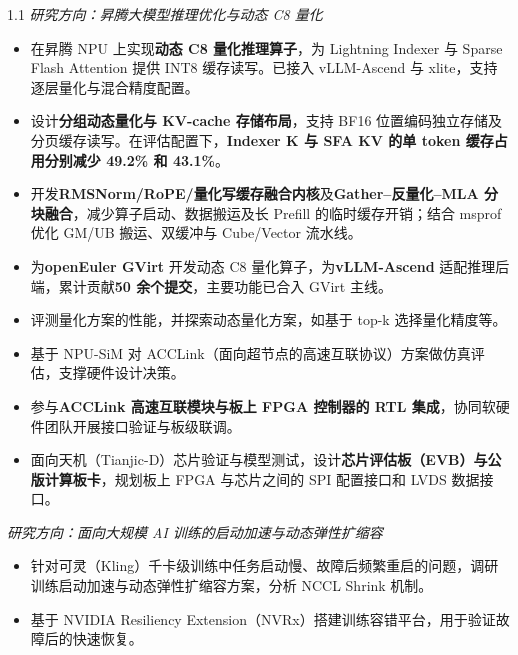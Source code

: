 \documentclass{resume}
\begin{document}
\begin{spacing}{1.1}
		\textit{研究方向：昇腾大模型推理优化与动态 C8 量化}
		\begin{itemize}
			\item 在昇腾 NPU 上实现\textbf{动态 C8 量化推理算子}，为 Lightning Indexer 与 Sparse Flash Attention 提供 INT8 缓存读写。已接入 vLLM-Ascend 与 xlite，支持逐层量化与混合精度配置。
			\item 设计\textbf{分组动态量化与 KV-cache 存储布局}，支持 BF16 位置编码独立存储及分页缓存读写。在评估配置下，\textbf{Indexer K 与 SFA KV 的单 token 缓存占用分别减少 49.2\% 和 43.1\%}。
			\item 开发\textbf{RMSNorm/RoPE/量化写缓存融合内核}及\textbf{Gather--反量化--MLA 分块融合}，减少算子启动、数据搬运及长 Prefill 的临时缓存开销；结合 msprof 优化 GM/UB 搬运、双缓冲与 Cube/Vector 流水线。
			\item 为\textbf{openEuler GVirt} 开发动态 C8 量化算子，为\textbf{vLLM-Ascend} 适配推理后端，累计贡献\textbf{50 余个提交}，主要功能已合入 GVirt 主线。
			\item 评测量化方案的性能，并探索动态量化方案，如基于 top-k 选择量化精度等。
		\end{itemize}
		
		\begin{itemize}
			\item 基于 NPU-SiM 对 ACCLink（面向超节点的高速互联协议）方案做仿真评估，支撑硬件设计决策。
			\item 参与\textbf{ACCLink 高速互联模块与板上 FPGA 控制器的 RTL 集成}，协同软硬件团队开展接口验证与板级联调。
			\item 面向天机（Tianjic-D）芯片验证与模型测试，设计\textbf{芯片评估板（EVB）与公版计算板卡}，规划板上 FPGA 与芯片之间的 SPI 配置接口和 LVDS 数据接口。
		\end{itemize}
		
		\textit{研究方向：面向大规模 AI 训练的启动加速与动态弹性扩缩容}
		\begin{itemize}
			\item 针对可灵（Kling）千卡级训练中任务启动慢、故障后频繁重启的问题，调研训练启动加速与动态弹性扩缩容方案，分析 NCCL Shrink 机制。
			\item 基于 NVIDIA Resiliency Extension（NVRx）搭建训练容错平台，用于验证故障后的快速恢复。
		\end{itemize}
		

\end{spacing}
\end{document}

